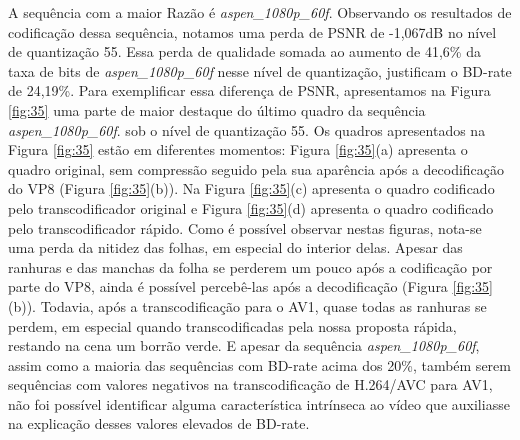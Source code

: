 A sequência com a maior Razão é \textit{aspen\_1080p\_60f}. Observando os resultados de codificação dessa sequência, notamos uma perda de PSNR de -1,067dB no nível de quantização 55. Essa perda de qualidade somada ao aumento de 41,6\% da taxa de bits de \textit{aspen\_1080p\_60f} nesse nível de quantização, justificam o BD-rate de 24,19\%. Para exemplificar essa diferença de PSNR, apresentamos na Figura \ref{fig:35} uma parte de maior destaque do último quadro da sequência \textit{aspen\_1080p\_60f}. sob o nível de quantização 55. Os quadros apresentados na Figura \ref{fig:35} estão em diferentes momentos: Figura \ref{fig:35}(a) apresenta o quadro original, sem compressão seguido pela sua aparência após a decodificação do VP8 (Figura \ref{fig:35}(b)). Na Figura \ref{fig:35}(c) apresenta o quadro codificado pelo transcodificador original e Figura \ref{fig:35}(d) apresenta o quadro codificado pelo transcodificador rápido. Como é possível observar nestas figuras, nota-se uma perda da nitidez das folhas, em especial do interior delas. Apesar das ranhuras e das manchas da folha se perderem um pouco após a codificação por parte do VP8, ainda é possível percebê-las após a decodificação (Figura \ref{fig:35}(b)). Todavia, após a transcodificação para o AV1, quase todas as ranhuras se perdem, em especial quando transcodificadas pela nossa proposta rápida, restando na cena um borrão verde. E apesar da sequência \textit{aspen\_1080p\_60f}, assim como a maioria das sequências com BD-rate acima dos 20\%, também serem sequências com valores negativos na transcodificação de H.264/AVC para AV1, não foi possível identificar alguma característica intrínseca ao vídeo que auxiliasse na explicação desses valores elevados de BD-rate.

